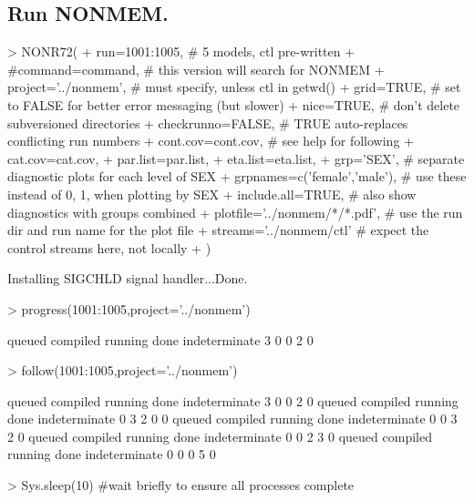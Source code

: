 \subsection{Run NONMEM.}
\begin{Schunk}
\begin{Sinput}
> NONR72(
+      run=1001:1005,                       # 5 models, ctl pre-written
+      #command=command,                    # this version will search for NONMEM
+      project='../nonmem',                 # must specify, unless ctl in getwd()
+      grid=TRUE,                          # set to FALSE for better error messaging (but slower)
+      nice=TRUE,                           # don't delete subversioned directories
+      checkrunno=FALSE,                    # TRUE auto-replaces conflicting run numbers
+      cont.cov=cont.cov,                   # see help for following
+      cat.cov=cat.cov,
+      par.list=par.list,
+      eta.list=eta.list,
+      grp='SEX',                           # separate diagnostic plots for each level of SEX
+      grpnames=c('female','male'),         # use these instead of 0, 1, when plotting by SEX
+      include.all=TRUE,                    # also show diagnostics with groups combined
+      plotfile='../nonmem/*/*.pdf',        # use the run dir and run name for the plot file 
+      streams='../nonmem/ctl'              # expect the control streams here, not locally
+ )
\end{Sinput}
\begin{Soutput}
Installing SIGCHLD signal handler...Done.
\end{Soutput}
\begin{Sinput}
> progress(1001:1005,project='../nonmem')
\end{Sinput}
\begin{Soutput}
       queued      compiled       running          done indeterminate 
            3             0             0             2             0 
\end{Soutput}
\begin{Sinput}
> follow(1001:1005,project='../nonmem')
\end{Sinput}
\begin{Soutput}
       queued      compiled       running          done indeterminate 
            3             0             0             2             0 
       queued      compiled       running          done indeterminate 
            0             3             2             0             0 
       queued      compiled       running          done indeterminate 
            0             0             3             2             0 
       queued      compiled       running          done indeterminate 
            0             0             2             3             0 
       queued      compiled       running          done indeterminate 
            0             0             0             5             0 
\end{Soutput}
\begin{Sinput}
> Sys.sleep(10)                             #wait briefly to ensure all processes complete
\end{Sinput}
\end{Schunk}
